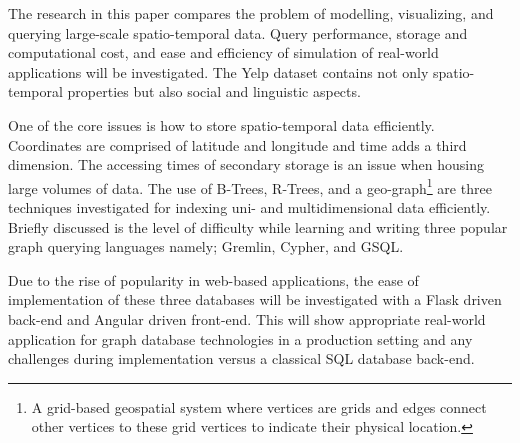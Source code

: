 The research in this paper compares the problem of modelling, visualizing, and querying large-scale spatio-temporal data. Query performance, storage and computational cost, and ease and efficiency of simulation of real-world applications will be investigated. The Yelp dataset contains not only spatio-temporal properties but also social and linguistic aspects.

One of the core issues is how to store spatio-temporal data efficiently. Coordinates are comprised of latitude and longitude and time adds a third dimension. The accessing times of secondary storage is an issue when housing large volumes of data. The use of B-Trees, R-Trees, and a geo-graph\footnote{A grid-based geospatial system where vertices are grids and edges connect other vertices to these grid vertices to indicate their physical location.} are three techniques investigated for indexing uni- and multidimensional data efficiently. Briefly discussed is the level of difficulty while learning and writing three popular graph querying languages namely; Gremlin, Cypher, and GSQL.

Due to the rise of popularity in web-based applications, the ease of implementation of these three databases will be investigated with a Flask \cite{flask} driven back-end and Angular \cite{angular} driven front-end. This will show appropriate real-world application for graph database technologies in a production setting and any challenges during implementation versus a classical SQL database back-end.
